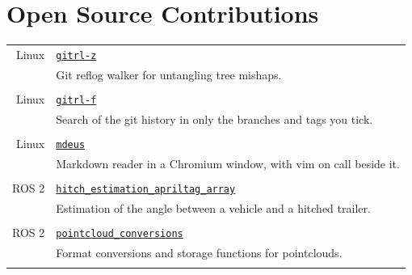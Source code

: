 \documentclass[a4paper,10pt,twoside]{article}
\begin{document}
\section{Open Source Contributions}

\begin{tabular}{rp{11cm}}
Linux & \href{https://github.com/li9i/gitrl-z}{\texttt{gitrl-z}} \\
      & \small{Git reflog walker for untangling tree mishaps.}\\
\multicolumn{2}{c}{} \\
Linux & \href{https://github.com/gitrl-tools/gitrl-f}{\texttt{gitrl-f}} \\
      & \small{Search of the git history in only the branches and tags you tick.}\\
\multicolumn{2}{c}{} \\
Linux & \href{https://github.com/li9i/mdeus}{\texttt{mdeus}} \\
      & \small{Markdown reader in a Chromium window, with vim on call beside it.}\\
\multicolumn{2}{c}{} \\


ROS 2 & \href{https://index.ros.org/p/hitch_estimation_apriltag_array/#humble}{\texttt{hitch\_estimation\_apriltag\_array}} \\
      & \small{Estimation of the angle between a vehicle and a hitched trailer.}\\
\multicolumn{2}{c}{} \\


ROS 2 & \href{https://index.ros.org/r/pointcloud_conversions/#lyrical}{\texttt{pointcloud\_conversions}} \\
      & \small{Format conversions and storage functions for pointclouds.}\\
\multicolumn{2}{c}{} \\
\end{tabular}

\vspace*{\fill}
\newpage


\vspace*{\fill}
\end{document}

